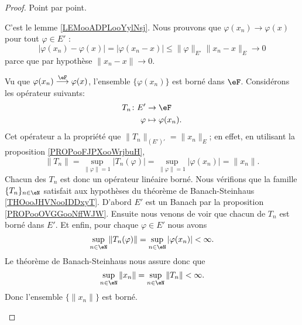\begin{proof}
	Point par point.
	\begin{subproof}
		C'est le lemme \ref{LEMooADPLooYylNsj}.
		Nous prouvons que \( \varphi(x_n)\to\varphi(x)\) pour tout \( \varphi\in E'\) :
		\begin{equation}
			| \varphi(x_n)-\varphi(x) |=| \varphi(x_n-x) |\leq \| \varphi \|_{E'}\| x_n-x \|_E\to 0
		\end{equation}
		parce que par hypothèse \( \| x_n-x \|\to 0\).

		Vu que \( \varphi(x_n)\stackrel{\eF}{\longrightarrow}\varphi(x)\), l'ensemble \( \{ \varphi(x_n) \}\) est borné dans \( \eF\). Considérons les opérateur suivants:
		\begin{equation}
			\begin{aligned}
				T_n\colon E' & \to \eF               \\
				\varphi      & \mapsto \varphi(x_n).
			\end{aligned}
		\end{equation}
		Cet opérateur a la propriété que \( \| T_n \|_{(E')'}=\| x_n \|_E\); en effet, en utilisant la proposition \ref{PROPooFJPXooWrjbuH},
		\begin{equation}
			\| T_n \|=\sup_{\| \varphi \|=1}| T_n(\varphi) |=\sup_{\| \varphi \|=1}| \varphi(x_n) |=\| x_n \|.
		\end{equation}
		Chacun des \( T_n\) est donc un opérateur linéaire borné. Nous vérifions que la famille \( \{ T_n \}_{n\in \eN}\) satisfait aux hypothèses du théorème de Banach-Steinhaus \ref{THOooJHVNooIDDxyT}. D'abord \( E'\) est un Banach par la proposition \ref{PROPooOVGGooNffWJW}. Ensuite nous venons de voir que chacun de  \(  T_n \) est borné dans \( E'\). Et enfin, pour chaque \( \varphi\in E'\) nous avons
		\begin{equation}
			\sup_{n\in \eN}\| T_n(\varphi) \|=\sup_{n\in \eN}| \varphi(x_n) |<\infty.
		\end{equation}
		Le théorème de Banach-Steinhaus nous assure donc que
		\begin{equation}
			\sup_{n\in \eN}\| x_n \|=\sup_{n\in \eN}\| T_n \|<\infty.
		\end{equation}
		Donc l'ensemble \( \{ \| x_n \| \}\) est borné.


\end{subproof}
\end{proof}
